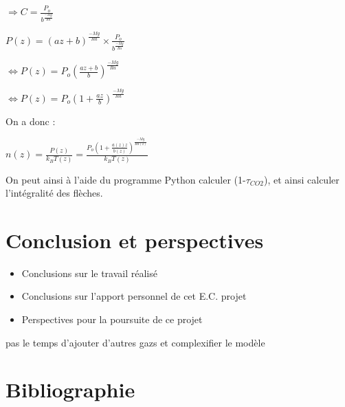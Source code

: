 \documentclass[a4paper, 12pt]{report} %
\begin{document}
\begin{center}
$\Rightarrow C= \frac{P_o}{b^{\frac{-Mg}{Ra}}}$
\end{center}

\begin{center}
$P(z) = (az+b)^{\frac{-Mg}{Ra}} \times \frac{P_o}{b^{\frac{-Mg}{Ra}}}$
\end{center}

\begin{center}
$\Leftrightarrow P(z)= P_o (\frac{az+b}{b})^{\frac{-Mg}{Ra}}$
\end{center}

\begin{center}
$\Leftrightarrow P(z)= P_o (1+\frac{az}{b})^{\frac{-Mg}{Ra}}$
\end{center}

On a donc :
\begin{center}
   $n(z)=\frac{P(z)}{{k_B}{T(z)}}= \frac{ P_o (1+\frac{a(z)z}{b(z)})^{\frac{-Mg}{Ra(z)}}}{{k_B}{T(z)}}$
\end{center}


On peut ainsi à l'aide du programme Python calculer (1-$\tau_{CO2}$), et ainsi calculer l'intégralité des flèches.

\chapter*{Conclusion et perspectives}
\begin{itemize}
\item Conclusions sur le travail réalisé
\item Conclusions sur l'apport personnel de cet E.C. projet
\item Perspectives pour la poursuite de ce projet
\end{itemize}

\vspace{\baselineskip}
pas le temps d'ajouter d'autres gazs et complexifier le modèle


\newpage

\renewcommand{\notesname}{} %
\chapter*{Bibliographie}
\makeatletter
\renewcommand{\enoteheading}{\par\vspace{1 em}}
\renewcommand{\theenmark}{\makebox[0.5 em][r]{\@theenmark}}
\renewcommand{\enoteformat}{\parindent = 2 em
  							\leftskip = 0.5 em
  							[\theenmark]\enspace\ignorespaces}							
\makeatother
\theendnotes
\end{document}

